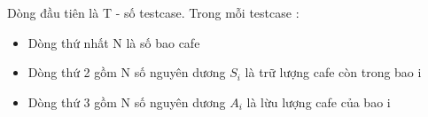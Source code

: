 Dòng đầu tiên là T - số testcase. Trong mỗi testcase :
\begin{itemize}
	\item Dòng thứ nhất N là số bao cafe
	\item Dòng thứ 2 gồm N số nguyên dương $S_{i}$ là trữ lượng cafe còn trong bao i
	\item Dòng thứ 3 gồm N số nguyên dương $A_{i}$ là lừu lượng cafe của bao i
\end{itemize}